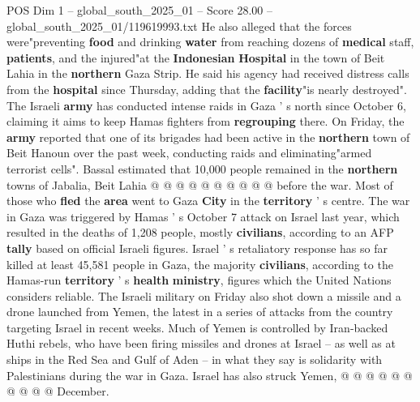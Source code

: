 \begin{textsample}{POS Dim 1 – global\_south\_2025\_01 – Score 28.00 – global\_south\_2025\_01/119619993.txt}
He also alleged that the forces were"preventing \textbf{food} and drinking \textbf{water} from reaching dozens of \textbf{medical} staff, \textbf{patients}, and the injured"at the \textbf{Indonesian} \textbf{Hospital} in the town of Beit Lahia in the \textbf{northern} Gaza Strip.
He said his agency had received distress calls from the \textbf{hospital} since Thursday, adding that the \textbf{facility}"is nearly destroyed".
The Israeli \textbf{army} has conducted intense raids in Gaza ' s north since October 6, claiming it aims to keep Hamas fighters from \textbf{regrouping} there.
On Friday, the \textbf{army} reported that one of its brigades had been active in the \textbf{northern} town of Beit Hanoun over the past week, conducting raids and eliminating"armed terrorist cells".
Bassal estimated that 10,000 people remained in the \textbf{northern} towns of Jabalia, Beit Lahia @ @ @ @ @ @ @ @ @ @ before the war.
Most of those who \textbf{fled} the \textbf{area} went to Gaza \textbf{City} in the \textbf{territory} ' s centre.
The war in Gaza was triggered by Hamas ' s October 7 attack on Israel last year, which resulted in the deaths of 1,208 people, mostly \textbf{civilians}, according to an AFP \textbf{tally} based on official Israeli figures.
Israel ' s retaliatory response has so far killed at least 45,581 people in Gaza, the majority \textbf{civilians}, according to the Hamas-run \textbf{territory} ' s \textbf{health} \textbf{ministry}, figures which the United Nations considers reliable.
The Israeli military on Friday also shot down a missile and a drone launched from Yemen, the latest in a series of attacks from the country targeting Israel in recent weeks.
Much of Yemen is controlled by Iran-backed Huthi rebels, who have been firing missiles and drones at Israel -- as well as at ships in the Red Sea and Gulf of Aden -- in what they say is solidarity with Palestinians during the war in Gaza.
Israel has also struck Yemen, @ @ @ @ @ @ @ @ @ @ December.

\end{textsample}
